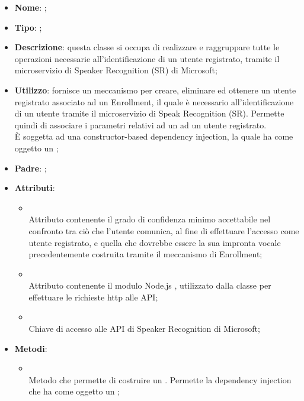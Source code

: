 \begin{itemize}
	\item \textbf{Nome}: ;
	\item \textbf{Tipo}: ;
	\item \textbf{Descrizione}: questa classe si occupa di realizzare e raggruppare tutte le operazioni necessarie all'identificazione di un utente registrato, tramite il microservizio di Speaker Recognition (SR) di Microsoft;
	\item \textbf{Utilizzo}: fornisce un meccanismo per creare, eliminare ed ottenere un utente registrato associato ad un Enrollment, il quale è necessario all'identificazione di un utente tramite il microservizio di Speak Recognition (SR). Permette quindi di associare i parametri relativi ad un  ad un utente registrato.\\
È soggetta ad una constructor-based dependency injection, la quale ha come oggetto un ;
	\item \textbf{Padre}: ;
	\item \textbf{Attributi}:
	\begin{itemize}
		\item[]  \\
		Attributo contenente il grado di confidenza minimo accettabile nel confronto tra ciò che l'utente comunica, al fine di effettuare l'accesso come utente registrato, e quella che dovrebbe essere la sua impronta vocale precedentemente costruita tramite il meccanismo di Enrollment;
		\item[]  \\
		Attributo contenente il modulo Node.js , utilizzato dalla classe per effettuare le richieste http alle API;
		\item[]  \\
		Chiave di accesso alle API di Speaker Recognition di Microsoft;
	\end{itemize}
	\item \textbf{Metodi}:
	\begin{itemize}
		\item[]  \\
		Metodo che permette di costruire un . Permette la dependency injection che ha come oggetto un ;\\

\end{itemize}
\end{itemize}
